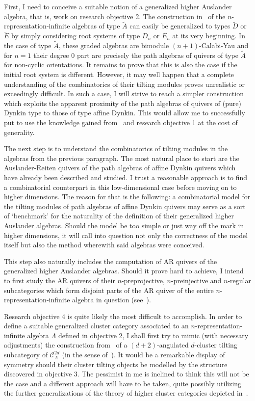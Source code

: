 \documentclass[a4paper,oneside,svgnames]{amsart}
\theoremstyle{plain}
\theoremstyle{definition}
\begin{document}
 First, I need to conceive a suitable notion of a generalized higher Auslander
 algebra, that is, work on research objective 2. The construction
 in~\cite[Section~5]{hio} of the $n$-representation-infinite algebras of type
 $\tilde{A}$ can easily be generalized to types $\tilde{D}$ or $\tilde{E}$ by
 simply considering root systems of type $D_n$ or $E_n$ at its very beginning.
 In the case of type $\tilde{A}$, these graded algebras are bimodule
 $(n+1)$-Calabi-Yau and for $n = 1$ their degree 0 part are precisely the path
 algebras of quivers of type $\tilde{A}$ for non-cyclic orientations. It remains
 to prove that this is also the case if the initial root system is different.
 However, it may well happen that a complete understanding of the combinatorics
 of their tilting modules proves unrealistic or exceedingly difficult. In such a
 case, I will strive to reach a simpler construction which exploits the apparent
 proximity of the path algebras of quivers of (pure) Dynkin type to those of
 type affine Dynkin. This would allow me to successfully put to use the
 knowledge gained from~\cite{ot} and research objective 1 at the cost of
 generality.

 The next step is to understand the combinatorics of tilting modules in the
 algebras from the previous paragraph. The most natural place to start are the
 Auslander-Reiten quivers of the path algebras of affine Dynkin quivers which
 have already been described and studied. I trust a reasonable approach is to
 find a combinatorial counterpart in this low-dimensional case before moving on
 to higher dimensions. The reason for that is the following: a combinatorial
 model for the tilting modules of path algebras of affine Dynkin quivers may
 serve as a sort of `benchmark' for the naturality of the definition of their
 generalized higher Auslander algebras. Should the model be too simple or just
 way off the mark in higher dimensions, it will call into question not only the
 correctness of the model itself but also the method wherewith said algebras
 were conceived.

 This step also naturally includes the computation of AR quivers of the
 generalized higher Auslander algebras. Should it prove hard to achieve, I
 intend to first study the AR quivers of their $n$-preprojective,
 $n$-preinjective and $n$-regular subcategories which form disjoint parts of the
 AR quiver of the entire $n$-representation-infinite algebra in question
 (see~\cite[Theorem 4.18]{hio}).

 Research objective 4 is quite likely the most difficult to accomplish. In order
 to define a suitable generalized cluster category associated to an
 $n$-representation-infinite algebra $\Lambda$ defined in objective 2, I shall
 first try to mimic (with necessary adjustments) the construction
 from~\cite[Section 5]{ot} of a $(d+2)$-angulated $d$-cluster tilting
 subcategory of $\mathcal{C}^{2d}_{\Lambda}$ (in the sense of~\cite{amiot1}). It
 would be a remarkable display of symmetry should their cluster tilting objects
 be modelled by the structure discovered in objective 3. The pessimist in me is
 inclined to think this will not be the case and a different approach will have
 to be taken, quite possibly utilizing the further generalizations of the theory
 of higher cluster categories depicted in~\cite{guo}.
\end{document}

